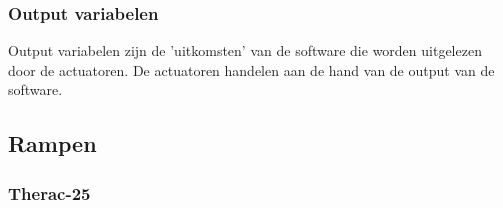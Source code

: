 \documentclass{article}%
\begin{document}
\subsubsection{Output variabelen}
Output variabelen zijn de 'uitkomsten' van de software die worden uitgelezen door de actuatoren. De actuatoren handelen aan de hand van de output van de software.




\clearpage %




\subsection{Rampen}

\subsubsection{Therac-25}
\end{document}
